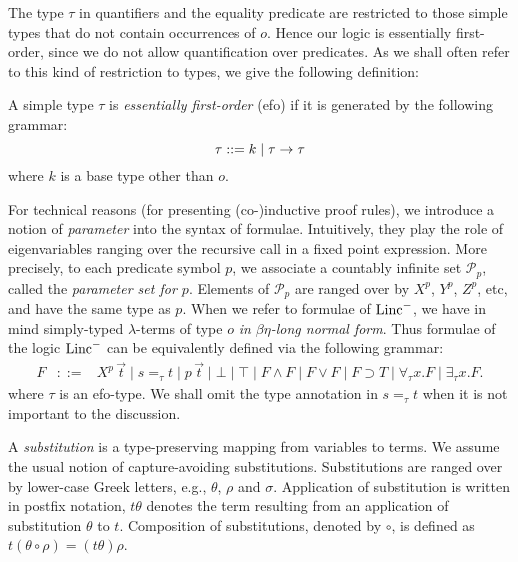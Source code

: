 \documentclass[preprint]{elsarticle}
\def\Pscr{{\mathcal P}}
\newcommand{\Linc}{{\rm Linc}^-}
\newcommand{\oimp}{\supset}
\begin{document}
The type $\tau$ in quantifiers and the equality predicate are 
restricted to those simple types that do not
contain occurrences of $o$. Hence our logic is essentially first-order, since
we do not allow quantification over predicates. 
As we shall often refer to this kind of restriction to types, we give
the following definition:


\begin{definition}
A simple type $\tau$ is \emph{essentially first-order} (efo) if it
is generated by the following grammar:
$$
  \tau \mathrel{::= }   k \mid \tau \rightarrow \tau\\
$$
where $k$ is a base type other than $o$. 
\end{definition}



For technical reasons (for presenting (co-)inductive proof rules), we
introduce a notion of \emph{parameter} into the syntax of formulae.
Intuitively, they play the role of eigenvariables ranging over the
recursive call in a fixed point expression.  More precisely, to each
predicate symbol $p$, we associate a countably infinite set $\Pscr_p$,
called the \emph{parameter set for $p$}. Elements of $\Pscr_p$ are
ranged over by $X^p$, $Y^p$, $Z^p$, etc, and have the same type as
$p$. 
When we refer to formulae of $\Linc$, we have in mind simply-typed
$\lambda$-terms of type $o$ \emph{in $\beta\eta$-long normal
  form}. Thus formulae of the logic $\Linc$ can be equivalently
defined via the following grammar:
$$
\begin{array}{rcl}
  F &\mathrel{::= } &  X^p\,\vec t \mid s =_\tau t \mid p\,\vec t   \mid 
  \bot \mid \top \mid F \land F \mid F \lor F \mid F \oimp T
  \mid \forall_\tau x. F \mid \exists_\tau x. F.
\end{array}
$$
where $\tau$ is an efo-type. 
We shall omit the type annotation in $s =_\tau t$ when it is not
important to the discussion.

A \emph{substitution} is a type-preserving mapping from variables to terms.  
We assume the usual notion of capture-avoiding substitutions. Substitutions are
ranged over by lower-case Greek letters, e.g., $\theta$, $\rho$ and
$\sigma$. Application of substitution is written in postfix notation,
\eg $t\theta$ denotes the term resulting from an application of
substitution $\theta$ to $t$. Composition of substitutions, denoted by
$\circ$, is defined as $t (\theta \circ \rho) = (t\theta)\rho$.
\end{document}
